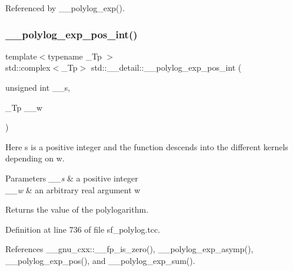 Referenced by \+\_\+\+\_\+polylog\+\_\+exp().

\mbox{\label{namespacestd_1_1____detail_a6d05f9213f03b1781250cc048739e55b}} 
\subsubsection{\texorpdfstring{\+\_\+\+\_\+polylog\+\_\+exp\+\_\+pos\+\_\+int()}{\_\_polylog\_exp\_pos\_int()}\hspace{0.1cm}{\footnotesize\ttfamily [2/2]}}
{\footnotesize\ttfamily template$<$typename \+\_\+\+Tp $>$ \\
std\+::complex$<$\+\_\+\+Tp$>$ std\+::\+\_\+\+\_\+detail\+::\+\_\+\+\_\+polylog\+\_\+exp\+\_\+pos\+\_\+int (\begin{DoxyParamCaption}\item[{unsigned int}]{\+\_\+\+\_\+s,  }\item[{\+\_\+\+Tp}]{\+\_\+\+\_\+w }\end{DoxyParamCaption})}

Here s is a positive integer and the function descends into the different kernels depending on w.


\begin{DoxyParams}{Parameters}
{\em \+\_\+\+\_\+s} & a positive integer \\
\hline
{\em \+\_\+\+\_\+w} & an arbitrary real argument w \\
\hline
\end{DoxyParams}
\begin{DoxyReturn}{Returns}
the value of the polylogarithm. 
\end{DoxyReturn}


Definition at line 736 of file sf\+\_\+polylog.\+tcc.



References \+\_\+\+\_\+gnu\+\_\+cxx\+::\+\_\+\+\_\+fp\+\_\+is\+\_\+zero(), \+\_\+\+\_\+polylog\+\_\+exp\+\_\+asymp(), \+\_\+\+\_\+polylog\+\_\+exp\+\_\+pos(), and \+\_\+\+\_\+polylog\+\_\+exp\+\_\+sum().

\mbox{\label{namespacestd_1_1____detail_a36da38ab2aa8a67c089412937d5a695b}} 
